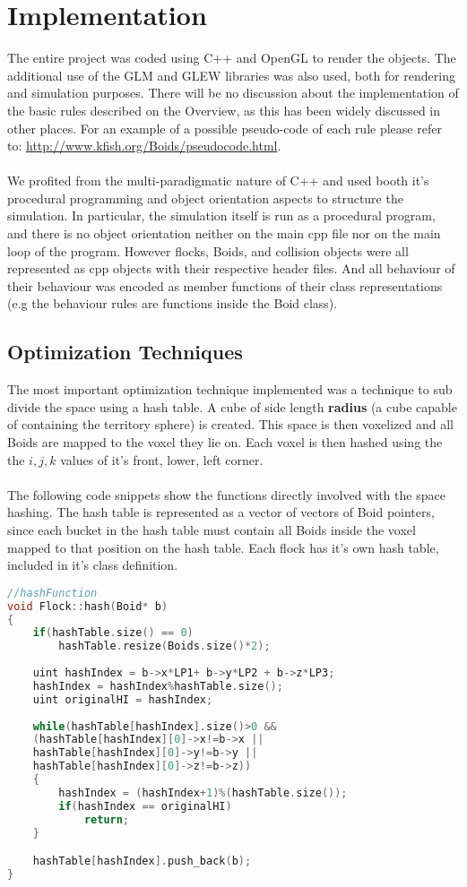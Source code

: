 \documentclass[12pt]{article}
\begin{document}
\section{Implementation}
The entire project was coded using C++ and OpenGL to render the objects. The additional use of the GLM and GLEW libraries was also used, both for rendering and simulation purposes. There will be no discussion about the implementation of the basic rules described on the Overview, as this has been widely discussed in other places. For an example of a possible pseudo-code of each rule please refer to: \url{http://www.kfish.org/Boids/pseudocode.html}.
\\ \\
We profited from the multi-paradigmatic nature of C++ and used booth it's procedural programming and object orientation aspects to structure the simulation. In particular, the simulation itself is run as a procedural program, and there is no object orientation neither on the main cpp file nor on the main loop of the program. However flocks, Boids, and collision objects were all represented as cpp objects with their respective header files. And all behaviour of their behaviour was encoded as member functions of their class representations (e.g the behaviour rules are functions inside the Boid class). 

\subsection{Optimization Techniques}
The most important optimization technique implemented was a technique to sub divide the space using a hash table. A cube of side length \textbf{radius} (a cube capable of containing the territory sphere) is created. This space is then voxelized and all Boids are mapped to the voxel they lie on. Each voxel is then hashed using the the $i,j,k$ values of it's front, lower, left corner.
\\ \\
\noindent The following code snippets show the functions directly involved with the space hashing. The hash table is represented as a vector of vectors of Boid pointers, since each bucket in the hash table must contain all Boids inside the voxel mapped to that position on the hash table. Each flock has it's own hash table, included in it's class definition.

\begin{minipage}[t]{\textwidth}
\begin{lstlisting}[language=C++]
//hashFunction
void Flock::hash(Boid* b)
{
	if(hashTable.size() == 0)
		hashTable.resize(Boids.size()*2);
	
	uint hashIndex = b->x*LP1+ b->y*LP2 + b->z*LP3;
	hashIndex = hashIndex%hashTable.size();
	uint originalHI = hashIndex;
	
	while(hashTable[hashIndex].size()>0 &&
	(hashTable[hashIndex][0]->x!=b->x ||
	hashTable[hashIndex][0]->y!=b->y ||
	hashTable[hashIndex][0]->z!=b->z))
	{
		hashIndex = (hashIndex+1)%(hashTable.size());
		if(hashIndex == originalHI)
			return;
	}

	hashTable[hashIndex].push_back(b);
}
\end{lstlisting}
\end{minipage}
\end{document}

